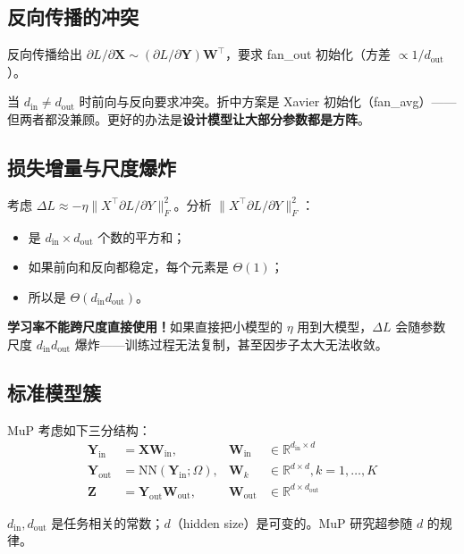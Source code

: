 \documentclass[11pt,a4paper]{ctexart}
\theoremstyle{definition}
\theoremstyle{remark}
\newcommand{\bigT}{\Theta}
\begin{document}
\subsection{反向传播的冲突}
 
反向传播给出 $\partial L/\partial \bm{X} \sim (\partial L/\partial \bm{Y}) \bm{W}^\top$，要求 fan\_out 初始化（方差 $\propto 1/d_\text{out}$）。
 
当 $d_\text{in} \neq d_\text{out}$ 时前向与反向要求冲突。折中方案是 Xavier 初始化（fan\_avg）——但两者都没兼顾。更好的办法是\textbf{设计模型让大部分参数都是方阵}。
 
\subsection{损失增量与尺度爆炸}
 
考虑 $\Delta L \approx -\eta \|X^\top \partial L/\partial Y\|_F^2$。分析 $\|X^\top \partial L/\partial Y\|_F^2$：
\begin{itemize}
    \item 是 $d_\text{in} \times d_\text{out}$ 个数的平方和；
    \item 如果前向和反向都稳定，每个元素是 $\bigT(1)$；
    \item 所以是 $\bigT(d_\text{in} d_\text{out})$。
\end{itemize}
 
\begin{warning}
\textbf{学习率不能跨尺度直接使用！}如果直接把小模型的 $\eta$ 用到大模型，$\Delta L$ 会随参数尺度 $d_\text{in} d_\text{out}$ 爆炸——训练过程无法复制，甚至因步子太大无法收敛。
\end{warning}
 
\subsection{标准模型簇}
 
MuP 考虑如下三分结构：
\begin{align*}
\bm{Y}_\text{in} &= \bm{X} \bm{W}_\text{in}, & \bm{W}_\text{in} &\in \mathbb{R}^{d_\text{in} \times d} \\
\bm{Y}_\text{out} &= \text{NN}(\bm{Y}_\text{in}; \Omega), & \bm{W}_k &\in \mathbb{R}^{d \times d}, k=1,\ldots,K \\
\bm{Z} &= \bm{Y}_\text{out} \bm{W}_\text{out}, & \bm{W}_\text{out} &\in \mathbb{R}^{d \times d_\text{out}}
\end{align*}
 
$d_\text{in}, d_\text{out}$ 是任务相关的常数；$d$（hidden size）是可变的。MuP 研究超参随 $d$ 的规律。
 
\end{document}
